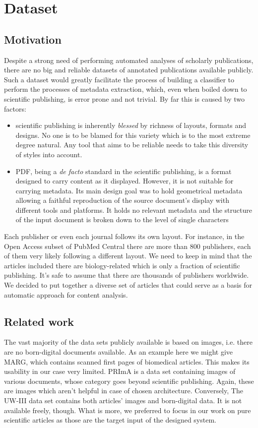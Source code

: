 \chapter{Dataset}
\section{Motivation}
Despite a strong need of performing automated analyses of scholarly publications, there are no big and reliable datasets of annotated publications available publicly. Such a dataset would greatly facilitate the process of building a classifier to perform the processes of metadata extraction, which, even when boiled down to scientific publishing, is error prone and not trivial. By far this is caused by two factors:
\begin{itemize}
\item scientific publishing is inherently \textit{blessed} by richness of layouts, formats and designs. No one is to be blamed for this variety which is to the most extreme degree natural. Any tool that aims to be reliable needs to take this diversity of styles into account.
\item PDF, being a \textit{de facto} standard in the scientific publishing, is a format designed to carry content as it displayed. However, it is not suitable for carrying metadata. Its main design goal was to hold geometrical metadata allowing a faithful reproduction of the source document's display with different tools and platforms. It holds no relevant metadata and the structure of the input document is broken down to the level of single characters
\end{itemize}
Each publisher or even each journal follows its own layout. For instance, in the Open Access subset of PubMed Central there are more than 800 publishers, each of them very likely following a different layout. We need to keep in mind that the articles included there are biology-related which is only a fraction of scientific publishing. It's safe to assume that there are thousands of publishers worldwide. We decided to put together a diverse set of articles that could serve as a basis for automatic approach for content analysis. 

\section{Related work}
The vast majority of the data sets publicly available is based on images, i.e. there are no born-digital documents available. As an example here we might give MARG, which contains scanned first pages of biomedical articles. This makes its usability in our case very limited. PRImA is a data set containing images of various documents, whose category goes beyond scientific publishing. Again, these are images which aren't helpful in case of chosen architecture. Conversely, The UW-III data set contains both articles' images and born-digital data. It is not available freely, though. What is more, we preferred to focus in our work on pure scientific articles as those are the target input of the designed system.
